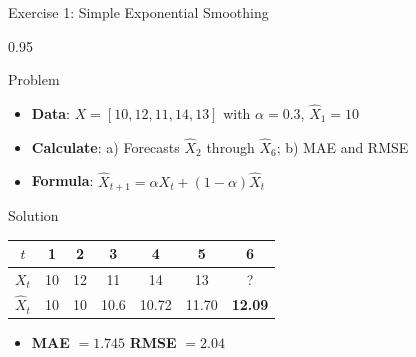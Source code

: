 \documentclass[9pt, aspectratio=169, t]{beamer}
\begin{document}
\begin{frame}{Exercise 1: Simple Exponential Smoothing}
    \begin{cminipage}{0.95\textwidth}
    \begin{alertblock}{Problem}
        \begin{itemize}\setlength{\itemsep}{0pt}
            \item \textbf{Data}: $X = [10, 12, 11, 14, 13]$ with $\alpha = 0.3$, $\hat{X}_1 = 10$
            \item \textbf{Calculate}: a) Forecasts $\hat{X}_2$ through $\hat{X}_6$; b) MAE and RMSE
            \item \textbf{Formula}: $\hat{X}_{t+1} = \alpha X_t + (1-\alpha)\hat{X}_t$
        \end{itemize}
    \end{alertblock}

    \vspace{0.2cm}
    \begin{exampleblock}{Solution}
        \begin{center}
        \small
        \begin{tabular}{c|ccccc|c}
            $t$ & 1 & 2 & 3 & 4 & 5 & 6\\
            \hline
            $X_t$ & 10 & 12 & 11 & 14 & 13 & ?\\
            $\hat{X}_t$ & 10 & 10 & 10.6 & 10.72 & 11.70 & \textbf{12.09}\\
        \end{tabular}
        \end{center}
        \begin{itemize}\setlength{\itemsep}{0pt}
            \item \textbf{MAE} $= 1.745$ \quad \textbf{RMSE} $= 2.04$
        \end{itemize}
    \end{exampleblock}
    \end{cminipage}
\end{frame}
\end{document}
